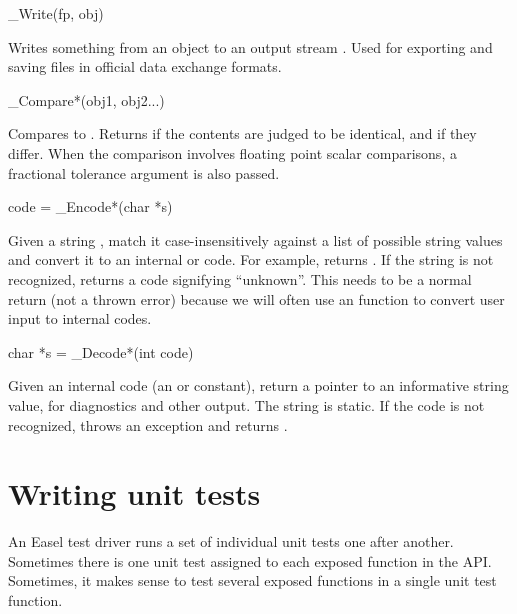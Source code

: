 \begin{sreapi}
\hypertarget{ifc:Write}
{\item[\_Write(fp, obj)]}
Writes something from an object to an output stream . Used
for exporting and saving files in official data exchange formats.

\hypertarget{ifc:Compare}
{\item[\_Compare*(obj1, obj2...)]}

Compares  to . Returns  if the
contents are judged to be identical, and  if they
differ. When the comparison involves floating point scalar
comparisons, a fractional tolerance argument  is also
passed. 

\hypertarget{ifc:Encode}
{\item[code = \_Encode*(char *s)]}

Given a string , match it case-insensitively against a list
of possible string values and convert it to an internal
 or  code. For example,
 returns
. If the string is not recognized, returns a
code signifying ``unknown''. This needs to be a normal return (not a
thrown error) because we will often use an  function to
convert user input to internal codes.

\hypertarget{ifc:Decode}
{\item[char *s = \_Decode*(int code)]}

Given an internal code (an  or  constant),
return a pointer to an informative string value, for diagnostics and
other output. The string is static. If the code is not recognized,
throws an  exception and returns .

\end{sreapi}






\section{Writing unit tests}

An Easel test driver runs a set of individual unit tests one after
another.  Sometimes there is one unit test assigned to each exposed
function in the API. Sometimes, it makes sense to test several exposed
functions in a single unit test function.

